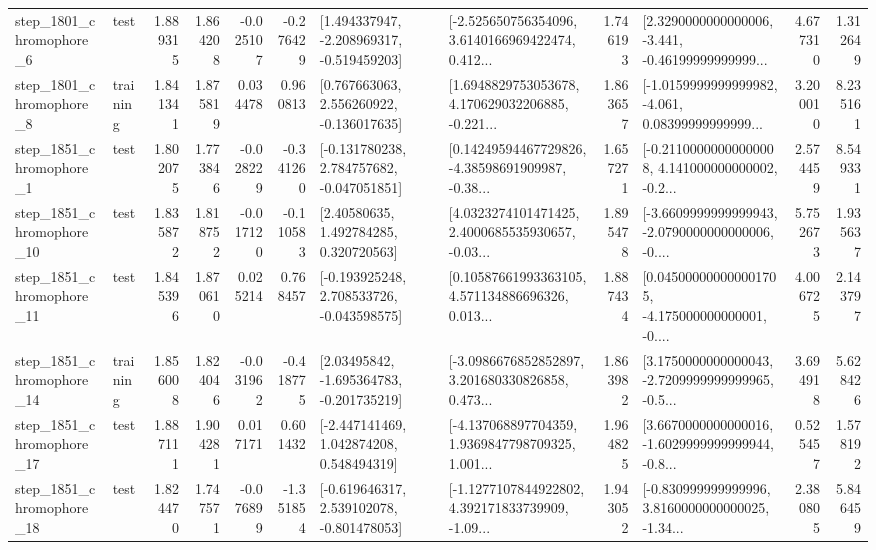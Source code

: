 \begin{tabular}{llrrrrllrlrr}
  step\_1801\_chromophore\_6 &      test &      1.889315 &    1.864208 &     -0.025107 & -0.276429 &   [1.494337947, -2.208969317, -0.519459203] &  [-2.525650756354096, 3.6140166969422474, 0.412... &       1.746193 &  [2.3290000000000006, -3.441, -0.46199999999999... &            4.677310 &          1.312649 \\
  step\_1801\_chromophore\_8 &  training &      1.841341 &    1.875819 &      0.034478 &  0.960813 &    [0.767663063, 2.556260922, -0.136017635] &  [1.6948829753053678, 4.170629032206885, -0.221... &       1.863657 &  [-1.0159999999999982, -4.061, 0.08399999999999... &            3.200010 &          8.235161 \\
  step\_1851\_chromophore\_1 &      test &      1.802075 &    1.773846 &     -0.028229 & -0.341260 &   [-0.131780238, 2.784757682, -0.047051851] &  [0.14249594467729826, -4.38598691909987, -0.38... &       1.657271 &  [-0.21100000000000008, 4.141000000000002, -0.2... &            2.574459 &          8.549331 \\
 step\_1851\_chromophore\_10 &      test &      1.835872 &    1.818752 &     -0.017120 & -0.110583 &      [2.40580635, 1.492784285, 0.320720563] &  [4.0323274101471425, 2.4000685535930657, -0.03... &       1.895478 &  [-3.6609999999999943, -2.0790000000000006, -0.... &            5.752673 &          1.935637 \\
 step\_1851\_chromophore\_11 &      test &      1.845396 &    1.870610 &      0.025214 &  0.768457 &   [-0.193925248, 2.708533726, -0.043598575] &  [0.10587661993363105, 4.571134886696326, 0.013... &       1.887434 &  [0.045000000000001705, -4.175000000000001, -0.... &            4.006725 &          2.143797 \\
 step\_1851\_chromophore\_14 &  training &      1.856008 &    1.824046 &     -0.031962 & -0.418775 &    [2.03495842, -1.695364783, -0.201735219] &  [-3.0986676852852897, 3.201680330826858, 0.473... &       1.863982 &  [3.1750000000000043, -2.7209999999999965, -0.5... &            3.694918 &          5.628426 \\
 step\_1851\_chromophore\_17 &      test &      1.887111 &    1.904281 &      0.017171 &  0.601432 &    [-2.447141469, 1.042874208, 0.548494319] &  [-4.137068897704359, 1.9369847798709325, 1.001... &       1.964825 &  [3.6670000000000016, -1.6029999999999944, -0.8... &            0.525457 &          1.578192 \\
 step\_1851\_chromophore\_18 &      test &      1.824470 &    1.747571 &     -0.076899 & -1.351854 &   [-0.619646317, 2.539102078, -0.801478053] &  [-1.1277107844922802, 4.392171833739909, -1.09... &       1.943052 &  [-0.830999999999996, 3.8160000000000025, -1.34... &            2.380805 &          5.846459 \\

\end{tabular}
